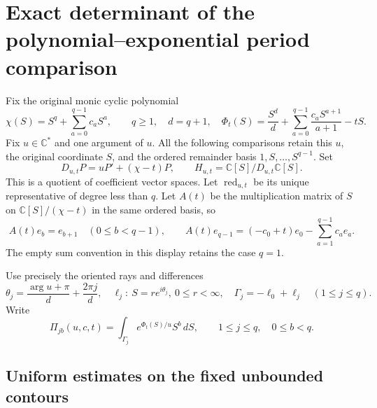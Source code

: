 \section{Exact determinant of the polynomial--exponential period comparison}
\label{sec:exponential-period-determinant-exact}

Fix the original monic cyclic polynomial
\[
 \chi(S)=S^q+\sum_{a=0}^{q-1}c_aS^a,\qquad q\geq1,
 \quad d=q+1,
 \quad\Phi_t(S)=\frac{S^d}{d}
       +\sum_{a=0}^{q-1}\frac{c_aS^{a+1}}{a+1}-tS.
\]
Fix $u\in\mathbb C^*$ and one argument of $u$. All the following
comparisons retain this $u$, the original coordinate $S$, and the
ordered remainder basis $1,S,\ldots,S^{q-1}$. Set
\[
 D_{u,t}P=uP'+(\chi-t)P,
 \qquad H_{u,t}=\mathbb C[S]/D_{u,t}\mathbb C[S].
\]
This is a quotient of coefficient vector spaces. Let
$\operatorname{red}_{u,t}$ be its unique representative of degree
less than $q$. Let $A(t)$ be the multiplication matrix of $S$ on
$\mathbb C[S]/(\chi-t)$ in the same ordered basis, so
\[
 A(t)e_b=e_{b+1}\quad(0\leq b<q-1),\qquad
 A(t)e_{q-1}=(-c_0+t)e_0-\sum_{a=1}^{q-1}c_ae_a.
 \tag{XD1}
\]
The empty sum convention in this display retains the case $q=1$.

Use precisely the oriented rays and differences
\[
 \theta_j=\frac{\arg u+\pi}{d}+\frac{2\pi j}{d},\quad
 \ell_j:\ S=re^{i\theta_j},\ 0\leq r<\infty,
 \quad\Gamma_j=-\ell_0+\ell_j\quad(1\leq j\leq q).
 \tag{XD2}
\]
Write
\[
 \Pi_{jb}(u,c,t)=\int_{\Gamma_j}e^{\Phi_t(S)/u}S^b\,dS,
 \qquad 1\leq j\leq q,\quad0\leq b<q.
 \tag{XD3}
\]

\subsection{Uniform estimates on the fixed unbounded contours}

